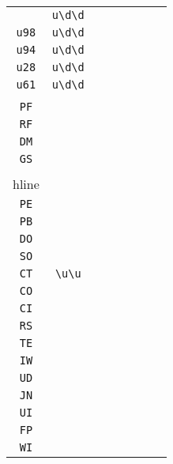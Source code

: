 \begin{longtable}{cccccccc}
\begin{tabular}{ll}
    \verb|u86| & \verb|u\d\d|\\
\verb|u98| & \verb|u\d\d|\\
\verb|u94| & \verb|u\d\d|\\
\verb|u28| & \verb|u\d\d|\\
\verb|u61| & \verb|u\d\d|
\end{tabular}
\\\midrule 
\begin{tabular}{l}
    \verb|PM|\\
\verb|PF|\\
\verb|RF|\\
\verb|DM|\\
\verb|GS|\\
\\hline\\
\verb|PE|\\
\verb|PB|\\
\verb|DO|\\
\verb|SO|\\
\verb|CT|
\end{tabular}

&
\verb|\u\u|
&

\begin{tabular}{l}
    \verb|\u\u|\\
\verb|CO|\\
\verb|CI|\\
\verb|RS|\\
\verb|TE|\\
\verb|IW|
\end{tabular}

&

\begin{tabular}{l}
    \verb|\u\u|\\
\verb|UD|\\
\verb|JN|\\
\verb|UI|\\
\verb|FP|\\
\verb|WI|
\end{tabular}

&


\end{longtable}
